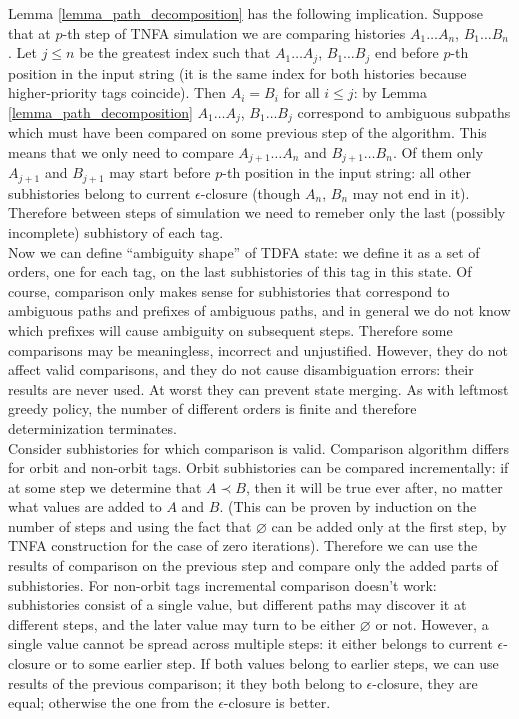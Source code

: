 \documentclass{article}
\newcommand{\Xeq}{\!=\!}
\theoremstyle{definition}
\begin{document}
\begin{multicols}{2}
Lemma \ref{lemma_path_decomposition} has the following implication.
Suppose that at $p$-th step of TNFA simulation we are comparing histories $A_1 \dots A_n$, $B_1 \dots B_n$.
Let $j \!\leq\! n$ be the greatest index such that $A_1 \dots A_j$, $B_1 \dots B_j$ end before $p$-th position in the input string
(it is the same index for both histories because higher-priority tags coincide).
Then $A_i \Xeq B_i$ for all $i \!\leq\! j$:
by Lemma \ref{lemma_path_decomposition} $A_1 \dots A_j$, $B_1 \dots B_j$
correspond to ambiguous subpaths which must have been compared on some previous step of the algorithm.
This means that we only need to compare $A_{j+1} \dots A_n$ and $B_{j+1} \dots B_n$.
Of them only $A_{j+1}$ and $B_{j+1}$ may start before $p$-th position in the input string:
all other subhistories belong to current $\epsilon$-closure (though $A_n$, $B_n$ may not end in it).
Therefore between steps of simulation we need to remeber only the last (possibly incomplete) subhistory of each tag.
\\

Now we can define ``ambiguity shape'' of TDFA state:
we define it as a set of orders, one for each tag, on the last subhistories of this tag in this state.
Of course, comparison only makes sense for subhistories that correspond to ambiguous paths and prefixes of ambiguous paths,
and in general we do not know which prefixes will cause ambiguity on subsequent steps.
Therefore some comparisons may be meaningless, incorrect and unjustified.
However, they do not affect valid comparisons,
and they do not cause disambiguation errors: their results are never used.
At worst they can prevent state merging.
As with leftmost greedy policy, the number of different orders is finite
and therefore determinization terminates.
\\

Consider subhistories for which comparison is valid.
Comparison algorithm differs for orbit and non-orbit tags.
Orbit subhistories can be compared incrementally:
if at some step we determine that $A \prec B$, then it will be true ever after, no matter what values are added to $A$ and $B$.
(This can be proven by induction on the number of steps
and using the fact that $\varnothing$ can be added only at the first step,
by TNFA construction for the case of zero iterations).
Therefore we can use the results of comparison on the previous step and compare only the added parts of subhistories.
For non-orbit tags incremental comparison doesn't work:
subhistories consist of a single value, but different paths may discover it at different steps,
and the later value may turn to be either $\varnothing$ or not.
However, a single value cannot be spread across multiple steps:
it either belongs to current $\epsilon$-closure or to some earlier step.
If both values belong to earlier steps, we can use results of the previous comparison;
it they both belong to $\epsilon$-closure, they are equal;
otherwise the one from the $\epsilon$-closure is better.
\\


\end{multicols}
\end{document}
